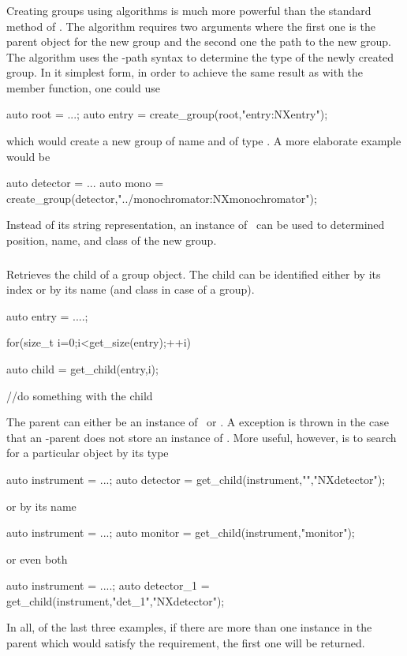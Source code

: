 \subsubsection{}

Creating groups using algorithms is much more powerful than the standard
 method of \nxgroup. 
The  algorithm requires two arguments where the first one is
the parent object for the new group and the second one the path to the new 
group. The  algorithm uses the \nexus-path syntax to determine
the type of the newly created group.
In it simplest form, in order to achieve the same result as with the 
 member function, one could use
\begin{cppcode}
auto root = ...;
auto entry = create_group(root,"entry:NXentry");
\end{cppcode}
which would create a new group of name  and of type .
A more elaborate example would be 
\begin{cppcode}
auto detector = ...
auto mono     = create_group(detector,"../monochromator:NXmonochromator");
\end{cppcode}
Instead of its string representation, an instance of \nxpath\ can be used 
to determined position, name, and class of the new group.



\subsubsection{}

Retrieves the child of a group object. The child can be identified either by its
index or by its name (and class in case of a group). 
\begin{cppcode}
auto entry = ....;

for(size_t i=0;i<get_size(entry);++i) 
{
    auto child = get_child(entry,i);

    //do something with the child
}
\end{cppcode}
The parent can either be an instance of \nxgroup\ or \nxobject.  A
 exception is thrown in the case that an \nxobject-parent does
not store an instance of \nxgroup.
More useful, however, is to search for a particular object by its type
\begin{cppcode}
auto instrument = ...;
auto detector   = get_child(instrument,"","NXdetector");
\end{cppcode}
or by its name
\begin{cppcode}
auto instrument = ...;
auto monitor    = get_child(instrument,"monitor");
\end{cppcode}
or even both
\begin{cppcode}
auto instrument = ....;
auto detector_1 = get_child(instrument,"det_1","NXdetector");
\end{cppcode}
In all, of the last three examples, if there are more than one instance in the 
parent which would satisfy the requirement, the first one will be returned. 


